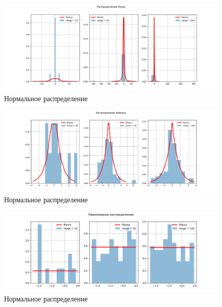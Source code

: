 \documentclass[12pt]{article}
\begin{document}
\begin{figure}[h!]
\begin{center}
\includegraphics[width=\textwidth]{caushi.png}
\caption{Нормальное распределение}
\end{center}
\end{figure}

\pagebreak

\begin{figure}[h!]
\begin{center}
\includegraphics[width=\textwidth]{laplace.png}
\caption{Нормальное распределение}
\end{center}
\end{figure}

\begin{figure}[h!]
\begin{center}
\includegraphics[width=\textwidth]{uniform.png}
\caption{Нормальное распределение}
\end{center}
\end{figure}
\end{document}
